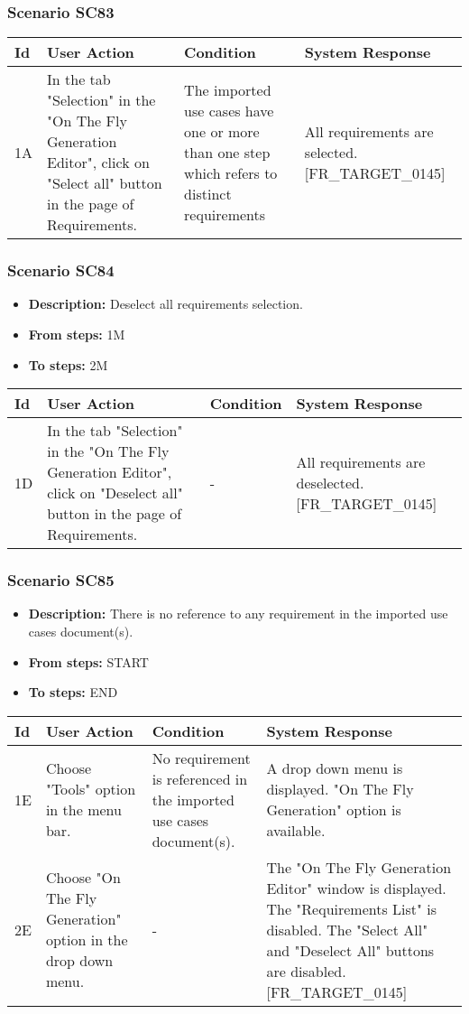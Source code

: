 \documentclass[a4paper,11pt]{article}
\newcommand{\bl}{\\ \hline}
\begin{document}
\subsubsection*{Scenario SC83}
\begin{tabular}{|p{0.4in}|p{1.5in}|p{1.5in}|p{1.5in}|}
\hline
Id & User Action & Condition & System Response \bl 
1A & In the tab "Selection" in the "On The Fly Generation
						Editor", click on "Select all" button in the page of Requirements.
					 & The imported use cases have one or more than one step
						which refers to distinct requirements & All requirements are selected. [FR_TARGET_0145]
					\bl
\end{tabular}
\subsubsection*{Scenario SC84}
\begin{itemize}
\item {\bf Description:} Deselect all requirements selection.
\item {\bf From steps:} 1M
\item {\bf To steps:} 2M
\end{itemize}
\begin{tabular}{|p{0.4in}|p{1.5in}|p{1.5in}|p{1.5in}|}
\hline
Id & User Action & Condition & System Response \bl 
1D & In the tab "Selection" in the "On The Fly Generation
						Editor", click on "Deselect all" button in the page of
						Requirements.  & - & All requirements are deselected. [FR_TARGET_0145]
					\bl
\end{tabular}
\subsubsection*{Scenario SC85}
\begin{itemize}
\item {\bf Description:} There is no reference to any requirement in the
					imported use cases document(s).
\item {\bf From steps:} START
\item {\bf To steps:} END
\end{itemize}
\begin{tabular}{|p{0.4in}|p{1.5in}|p{1.5in}|p{1.5in}|}
\hline
Id & User Action & Condition & System Response \bl 
1E & Choose "Tools" option in the menu bar.  & No requirement is referenced in the imported use cases
						document(s). & A drop down menu is displayed. "On The Fly Generation"
						option is available.\bl
2E & Choose "On The Fly Generation" option in the drop down
						menu. & - & The "On The Fly Generation Editor" window is displayed.
						The "Requirements List" is disabled. The "Select All" and
						"Deselect All" buttons are disabled. [FR_TARGET_0145]\bl
\end{tabular}
\end{document}
